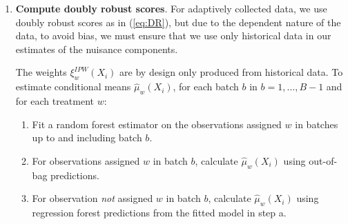 \documentclass[letterpaper, 12pt, parskip=full,DIV=10]{scrartcl}
\begin{document}
\begin{enumerate}
\item \textbf{Compute doubly robust scores}. For adaptively collected data, we use doubly robust scores as in (\ref{eq:DR}), but due to the dependent nature of the data, to avoid bias, we must ensure that we use only historical data in our estimates of the nuisance components. \label{step1}

The weights $\xi^{IPW}_w(X_i)$ are by design only produced from historical data. To estimate conditional means $\hat \mu_w(X_i)$, for each batch $b$ in $b = 1, \dots, B-1$ and for each treatment $w$:
\begin{enumerate}
\item Fit a random forest estimator on the observations assigned $w$ in batches up to and including batch $b$. 
\item For observations assigned $w$ in batch $b$, calculate $\hat\mu_w(X_i)$ using out-of-bag predictions. 
\item For observation \textit{not} assigned $w$ in batch $b$, calculate $\hat\mu_w(X_i)$ using regression forest predictions from the fitted model in step a. 
\end{enumerate}


\end{enumerate}
\end{document}
